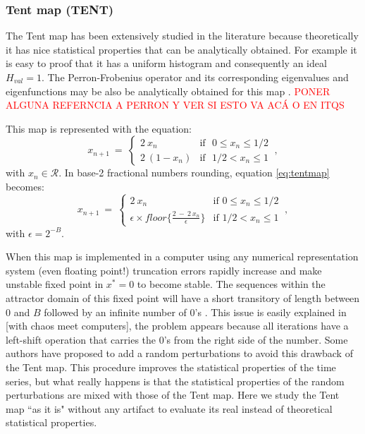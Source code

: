 \subsubsection{Tent map (TENT)} \label{sssec:tent}

The Tent map has been extensively studied in the literature because theoretically it has nice statistical properties that can be analytically obtained.
For example it is easy to proof that it has a uniform histogram and consequently an ideal $H_{val}=1$.
The Perron-Frobenius operator and its corresponding eigenvalues and eigenfunctions may be also be analytically obtained for this map \cite{tent}.
\textcolor{red}{PONER ALGUNA REFERNCIA A PERRON Y VER SI ESTO VA ACÁ O EN ITQS}

This map is represented with the equation:
\begin{equation}\label{eq:tentmap}
x_{n+1}~=~ \left\{ \begin{array}{ll}
2~{x_n} & \textrm{if ~$0\leq x_n\leq 1/2$}\\
2~(1-{x_n}) & \textrm{if ~$1/2<x_n\leq 1$} 
\end{array} \right.  \ ,
\end{equation}
with $x_n\in\mathcal{R}$.
In base-2 fractional numbers rounding, equation \ref{eq:tentmap} becomes:
\begin{equation}\label{eq:tentdecbin}
x_{n+1}~=~ \left\{ \begin{array}{ll}
2~{x_n} & \textrm{if $0\leq x_n\leq 1/2$}\\
\epsilon \times floor\{\frac{2~-~2~x_n}{\epsilon}\} & \textrm{if $1/2<x_n\leq 1$} 
\end{array} \right.  \ ,
\end{equation}
with $\epsilon=2^{-B}$.

When this map is implemented in a computer using any numerical representation system (even floating point!) truncation errors rapidly increase and make unstable fixed point in $x^*=0$ to become stable.
The sequences within the attractor domain of this fixed point will have a short transitory of length between $0$ and $B$ followed by an infinite number of  $0$'s \cite{Jessa1993,Callegari1997}.
This issue is easily explained in [with chaos meet computers], the problem appears because all iterations have a left-shift operation that carries the $0$'s from the right side of the number.
Some authors \cite{buscar} have proposed to add a random perturbations to avoid this drawback of the Tent map.
This procedure improves the statistical properties of the time series, but what really happens is that the statistical properties of the random perturbations are mixed with those of the Tent map.
Here we study the Tent map ``as it is" without any artifact to evaluate its real instead of theoretical statistical properties. 

